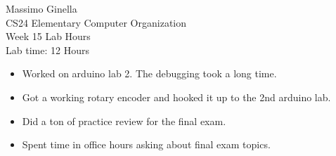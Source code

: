 \documentclass[12pt]{article}
\begin{document}
	\begin{center}
		Massimo Ginella \\
		CS24 Elementary Computer Organization \\
		Week 15 Lab Hours \\
		Lab time: 12 Hours \vspace{0.5cm} \\
	\end{center}
	
	\begin{itemize}
		\item Worked on arduino lab 2. The debugging took a long time.
		\item Got a working rotary encoder and hooked it up to the 2nd arduino lab.
		\item Did a ton of practice review for the final exam.
		\item Spent time in office hours asking about final exam topics.
	\end{itemize}
	
	
	
\end{document}
